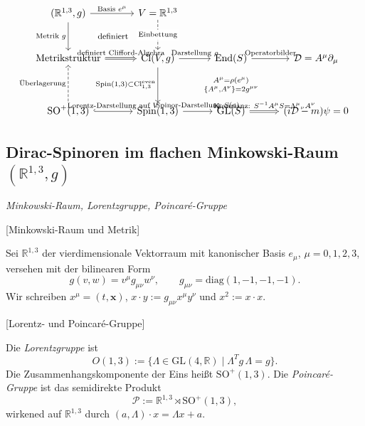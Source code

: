 \documentclass[10pt, letterpaper]{article}
\newcommand{\R}{\mathbb{R}}
\newcommand{\SO}{\mathrm{SO}}
\begin{document}
\[
\begin{tikzcd}[row sep=2.5em, column sep=2.8em, ampersand replacement=\&]
(\mathbb{R}^{1,3}, g)
  \arrow[d, "{\text{Metrik } g}"']
  \arrow[dr, phantom, "{\text{\footnotesize definiert}}" description]
  \arrow[r, "{\text{Basis } e^\mu}"]
  \& V=\mathbb{R}^{1,3}
      \arrow[d, dashed, "{\text{Einbettung}}" description]
  \\[0.7ex]
\text{Metrikstruktur}
  \arrow[r, Rightarrow, "{\text{definiert Clifford-Algebra}}"]
  \& \mathrm{Cl}(V,g)
      \arrow[r, "{\text{Darstellung } \rho}"]
      \arrow[d, "{\mathrm{Spin}(1,3)\subset \mathrm{Cl}_{1,3}^{\mathrm{even}}}" left]
  \& \operatorname{End}(S)
      \arrow[r, "{\text{Operatorbilder}}"]
      \arrow[d, phantom, "{\substack{A^\mu = \rho(e^\mu)\\[0.2ex]\{A^\mu,A^\nu\}=2g^{\mu\nu}}}"]
  \& \mathcal{D} = A^\mu \partial_\mu
  \\[2.1ex]
\mathrm{SO}^{+}(1,3)
  \arrow[u, dashed, "{\text{Überlagerung}}" left]
  \arrow[r, hook, "{\text{Lorentz-Darstellung auf } V}"]
  \& \mathrm{Spin}(1,3)
      \arrow[r, "{\text{Spinor-Darstellung } S(a)}"]
  \& \mathrm{GL}(S)
      \arrow[r, Rightarrow, "{\text{Kovarianz: } S^{-1}A^\mu S = \Lambda^\mu{}_\nu A^\nu}"]
  \& (i\mathcal{D} - m)\psi = 0
\end{tikzcd}
\]


\pagebreak

\subsection{Dirac-Spinoren im flachen Minkowski-Raum $(\R^{1,3},g)$}

\emph{Minkowski-Raum, Lorentzgruppe, Poincar\'e-Gruppe}

[Minkowski-Raum und Metrik]

Sei $\R^{1,3}$ der vierdimensionale Vektorraum mit kanonischer Basis $e_\mu$, $\mu=0,1,2,3$, versehen mit der bilinearen Form
\[
g(v,w)=v^\mu g_{\mu\nu} w^\nu, \qquad g_{\mu\nu}=\mathrm{diag}(1,-1,-1,-1).
\]
Wir schreiben $x^\mu=(t,\mathbf x)$, $x\cdot y := g_{\mu\nu} x^\mu y^\nu$ und $x^2:=x\cdot x$.


[Lorentz- und Poincar\'e-Gruppe]

Die \emph{Lorentzgruppe} ist
\[
O(1,3):=\{\Lambda\in \mathrm{GL}(4,\R)\mid \Lambda^T g \,\Lambda = g\}.
\]
Die Zusammenhangskomponente der Eins hei\ss t $\SO^+(1,3)$. Die \emph{Poincar\'e-Gruppe} ist das semidirekte Produkt
\[
\mathcal P := \R^{1,3} \rtimes \SO^+(1,3),
\]
wirkened auf $\R^{1,3}$ durch $(a,\Lambda)\cdot x = \Lambda x + a$.
\end{document}
